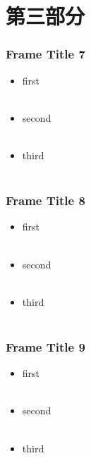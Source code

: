\documentclass{beamer}
\begin{document}
	\section{第三部分}
	\begin{frame}
		\frametitle{Frame Title 7}
		\begin{itemize} 
			\item first \\~\\
			\item second \\~\\
			\item third \\~\\
		\end{itemize}
	\end{frame}
	\begin{frame}
		\frametitle{Frame Title 8}
		\begin{itemize} 
			\item first \\~\\
			\item second \\~\\
			\item third \\~\\
		\end{itemize}
	\end{frame}
	\begin{frame}
		\frametitle{Frame Title 9}
		\begin{itemize} 
			\item first \\~\\
			\item second \\~\\
			\item third \\~\\
		\end{itemize}
	\end{frame}
\end{document}
